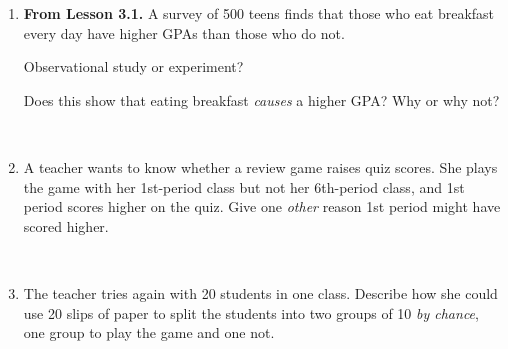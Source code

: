 \documentclass[12pt]{article}
\begin{document}

\vspace{0.28in}

\begin{enumerate}[leftmargin=1.9em, itemsep=0.42in]

  \item \textbf{From Lesson 3.1.} A survey of 500 teens finds that those who eat breakfast
        every day have higher GPAs than those who do not.

        \vspace{12pt}
        Observational study or experiment? 
        \vspace{16pt}

        Does this show that eating breakfast \emph{causes} a higher GPA? Why or why not?
        \vspace{12pt}

        \\[18pt]

  \item A teacher wants to know whether a review game raises quiz scores. She plays the game
        with her 1st-period class but not her 6th-period class, and 1st period scores higher on
        the quiz. Give one \emph{other} reason 1st period might have scored higher.

        \vspace{12pt}
        \\[18pt]

  \item The teacher tries again with 20 students in one class. Describe how she could use 20
        slips of paper to split the students into two groups of 10 \emph{by chance}, one group
        to play the game and one not.

        \vspace{12pt}
        \\[18pt]\\[18pt]\ansline{}

\end{enumerate}
\end{document}
